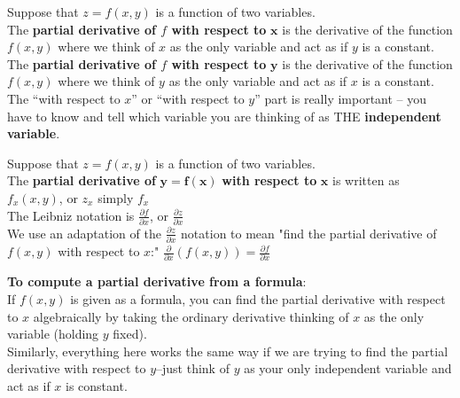 \begin{tcolorbox}[title = {Partial Derivatives}]
\noindent Suppose that $z = f(x, y)$ is a function of two variables.\\

The \textbf{partial derivative of $f$ with respect to} $\bm{x}$ is the derivative of the function $f(x,y)$ where we think of $x$ as the only variable and act as if $y$ is a constant.\\

The \textbf{partial derivative of $f$ with respect to} $\bm{y}$ is the derivative of the function $f(x,y)$ where we think of $y$ as the only variable and act as if $x$ is a constant.\\

The “with respect to $x$” or “with respect to $y$” part is really important – you have to know and tell which variable you are thinking of as THE \textbf{independent variable}.
\end{tcolorbox}

\begin{tcolorbox}[title = {Notation for the Partial Derivative}]
\noindent Suppose that $z = f(x, y)$ is a function of two variables.\\

\noindent The \textbf{partial derivative of} $\bm{y=f(x)}$ \textbf{with respect to} $\bm{x}$ is written as $f_x (x,y)$, or $z_x$ simply $f_x$\\

\noindent The Leibniz notation is $\displaystyle\frac{\partial f}{\partial x}$, or $\displaystyle\frac{\partial z}{\partial x}$\\

We use an adaptation of the $\displaystyle\frac{\partial z}{\partial x}$ notation to mean "find the partial derivative of $f(x,y)$ with respect to $x$:" $\displaystyle\frac{\partial }{\partial x}(f(x,y))=\frac{\partial f}{\partial x}$\\

\end{tcolorbox}
\noindent \textbf{To compute a partial derivative from a formula}:\\

\noindent If $f(x,y)$ is given as a formula, you can find the partial derivative with respect to $x$ algebraically by taking the ordinary derivative thinking of $x$ as the only variable (holding $y$ fixed).\\

\noindent Similarly, everything here works the same way if we are trying to find the partial derivative with respect to $y$--just think of $y$ as your only independent variable and act as if $x$ is constant.


